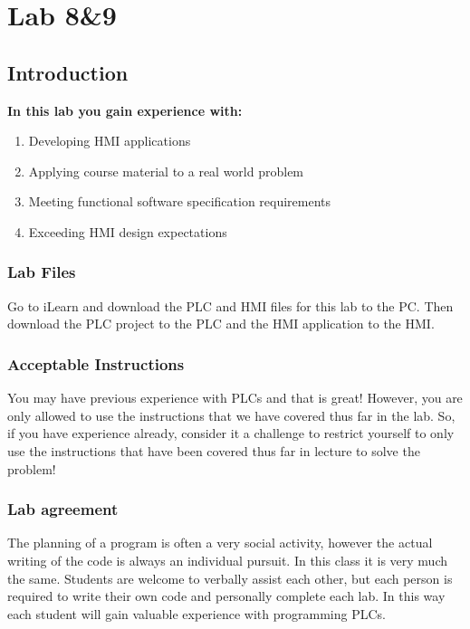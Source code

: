 \chapter{Lab 8\&9}
\setcounter{TASignatures}{0}
\setcounter{AsideCounter}{0}

\section{Introduction}
    \vspace{0.1em}

    \textbf{In this lab you gain experience with:}
    \begin{enumerate}
        \item Developing HMI applications
        \item Applying course material to a real world problem
        \item Meeting functional software specification requirements
        \item Exceeding HMI design expectations
    \end{enumerate}

\subsection{Lab Files}

Go to iLearn and download the PLC and HMI files for this lab to the PC. Then download the PLC project to the PLC and the HMI application to the HMI. 

\subsection{Acceptable Instructions}

You may have previous experience with PLCs and that is great! However, you are only allowed to use the instructions that we have covered thus far in the lab. So, if you have experience already, consider it a challenge to restrict yourself to only use the instructions that have been covered thus far in lecture to solve the problem!

\subsection{Lab agreement}

The planning of a program is often a very social activity, however the actual writing of the code is always an individual pursuit. In this class it is very much the same. Students are welcome to verbally assist each other, but each person is required to write their own code and personally complete each lab. In this way each student will gain valuable experience with programming PLCs. 

